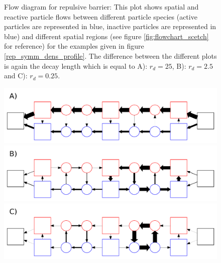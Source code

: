 \begin{minipage}[t]{.372 \textwidth}
    \vspace{0.5 cm}
    \begin{figure}[H]
        \caption{Flow diagram for repulsive barrier: This plot shows spatial and reactive particle flows between different particle species (active particles are represented in blue, inactive particles are represented in blue) and different spatial regions (see figure \ref{fig:flowchart_scetch} for reference) for the examples given in figure \ref{rep_symm_dens_profile}. The difference between the different plots is again the decay length which is equal to \newline A): $r_d=25$, B): $r_d=2.5$ and \newline C): $r_d = 0.25$.
    \label{fig:flow_repulsive}}
    \end{figure}
\end{minipage}\hspace{0.02 \textwidth}\begin{minipage}[t]{.608 \textwidth}
    \begin{figure}[H]
        \includegraphics[width = 1 \textwidth]{plots/rep_flowchart0.pdf} 
        \includegraphics[width = 1 \textwidth]{plots/rep_flowchart1.pdf} 
        \includegraphics[width = 1 \textwidth]{plots/rep_flowchart2.pdf}
    \end{figure}
\end{minipage}
